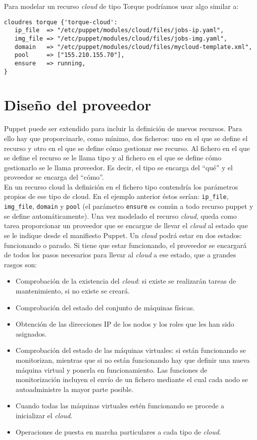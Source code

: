 Para modelar un recurso \emph{cloud} de tipo Torque podríamos usar algo similar a:

\begin{lstlisting}
cloudres torque {'torque-cloud':
   ip_file  => "/etc/puppet/modules/cloud/files/jobs-ip.yaml",
   img_file => "/etc/puppet/modules/cloud/files/jobs-img.yaml",
   domain   => "/etc/puppet/modules/cloud/files/mycloud-template.xml",
   pool     => ["155.210.155.70"],
   ensure   => running,
}
\end{lstlisting}


\section{Diseño del proveedor}

Puppet puede ser extendido para incluir la definición de nuevos recursos. Para ello hay que proporcinarle, como mínimo, dos ficheros: uno en el que se define el recurso y otro en el que se define cómo gestionar ese recurso. Al fichero en el que se define el recurso se le llama tipo y al fichero en el que se define cómo gestionarlo se le llama proveedor. Es decir, el tipo se encarga del ``qué'' y el proveedor se encarga del ``cómo''.\\

En un recurso cloud la definición en el fichero tipo contendría los parámetros propios de ese tipo de cloud. En el ejemplo anterior éstos serían: \texttt{ip\_file}, \texttt{img\_file}, \texttt{domain} y \texttt{pool} (el parámetro \texttt{ensure} es común a todo recurso puppet y se define automáticamente). Una vez modelado el recurso \emph{cloud}, queda como tarea proporcionar un proveedor que se encargue de llevar el \emph{cloud} al estado que se le indique desde el manifiesto Puppet. Un \emph{cloud} podrá estar en dos estados: funcionando o parado. Si tiene que estar funcionando, el proveedor se encargará de todos los pasos necesarios para llevar al \emph{cloud} a ese estado, que a grandes rasgos son:

\begin{itemize}
\item Comprobación de la existencia del \emph{cloud}: si existe se realizarán tareas de mantenimiento, si no existe se creará.
\item Comprobación del estado del conjunto de máquinas físicas.
\item Obtención de las direcciones IP de los nodos y los roles que les han sido asignados.
\item Comprobación del estado de las máquinas virtuales: si están funcionando se monitorizan, mientras que si no están funcionando hay que definir una nueva máquina virtual y ponerla en funcionamiento. Las funciones de monitorización incluyen el envío de un fichero mediante el cual cada nodo se autoadministre la mayor parte posible.
\item Cuando todas las máquinas virtuales estén funcionando se procede a inicializar el \emph{cloud}.
\item Operaciones de puesta en marcha particulares a cada tipo de \emph{cloud}.
\end{itemize}

